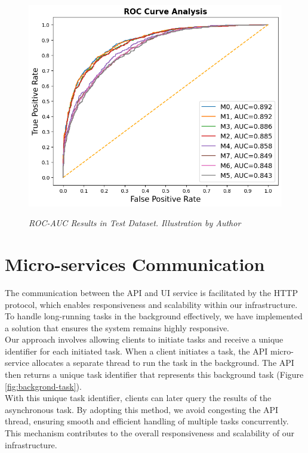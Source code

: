 \begin{figure}[H]
  \centering
  \includegraphics[width=\textwidth]{imatges/results/rocaucanalysis-all.png}
  \caption[ROC-AUC Results in Test Dataset]{\textit{ROC-AUC Results in Test Dataset. Illustration by Author}}
  {\label{fig:rocaucanalysis-all}}
\end{figure}

\newpage


\section{Micro-services Communication}

The communication between the API and UI service is facilitated by the HTTP
protocol, which enables responsiveness and scalability within our
infrastructure. To handle long-running tasks in the background effectively, we
have implemented a solution that ensures the system remains highly responsive.
\\

Our approach involves allowing clients to initiate tasks and receive a unique
identifier for each initiated task. When a client initiates a task, the API
micro-service allocates a separate thread to run the task in the background.
The API then returns a unique task identifier that represents this background
task (Figure \ref{fig:backgrond-task}). \\

With this unique task identifier, clients can later query the results of the
asynchronous task. By adopting this method, we avoid congesting the API thread,
ensuring smooth and efficient handling of multiple tasks concurrently. This
mechanism contributes to the overall responsiveness and scalability of our
infrastructure.


